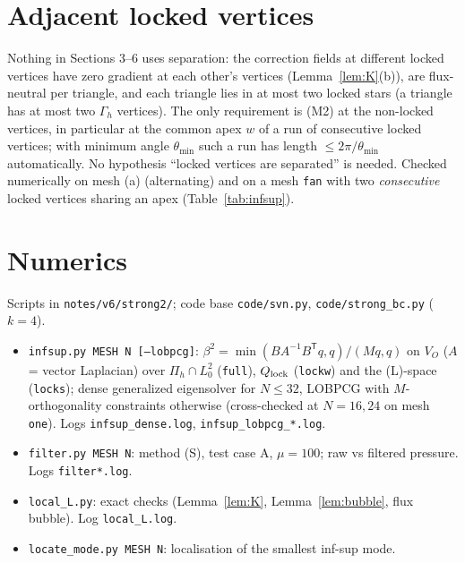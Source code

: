 \documentclass[11pt]{article}
\theoremstyle{remark}
\newcommand{\VO}{V_O}
\newcommand{\Pih}{\Pi_h}
\newcommand{\Ql}{Q_{\rm lock}}
\begin{document}
\section{Adjacent locked vertices}
Nothing in Sections 3--6 uses separation: the correction fields at different locked vertices have zero gradient
at each other's vertices (Lemma~\ref{lem:K}(b)), are flux-neutral per triangle, and each triangle lies in at most
two locked stars (a triangle has at most two $\Gamma_h$ vertices). The only requirement is (M2) at the non-locked
vertices, in particular at the common apex $w$ of a run of consecutive locked vertices; with minimum angle
$\theta_{\min}$ such a run has length $\le 2\pi/\theta_{\min}$ automatically. No hypothesis ``locked vertices are
separated'' is needed. Checked numerically on mesh (a) (alternating) and on a mesh \texttt{fan} with two
\emph{consecutive} locked vertices sharing an apex (Table~\ref{tab:infsup}).

\section{Numerics}
Scripts in \texttt{notes/v6/strong2/}; code base \texttt{code/svn.py}, \texttt{code/strong\_bc.py} ($k=4$).
\begin{itemize}
\item \texttt{infsup.py MESH N [--lobpcg]}: $\beta^2=\min(BA^{-1}B^{\mathsf T}q,q)/(Mq,q)$ on $\VO$ ($A$ = vector
Laplacian) over $\Pih\cap L^2_0$ (\texttt{full}), $\Ql$ (\texttt{lockw}) and the (L)-space (\texttt{locks}); dense
generalized eigensolver for $N\le32$, LOBPCG with $M$-orthogonality constraints otherwise (cross-checked at
$N=16,24$ on mesh \texttt{one}). Logs \texttt{infsup\_dense.log}, \texttt{infsup\_lobpcg\_*.log}.
\item \texttt{filter.py MESH N}: method (S), test case A, $\mu=100$; raw vs filtered pressure. Logs \texttt{filter*.log}.
\item \texttt{local\_L.py}: exact checks (Lemma~\ref{lem:K}, Lemma~\ref{lem:bubble}, flux bubble). Log \texttt{local\_L.log}.
\item \texttt{locate\_mode.py MESH N}: localisation of the smallest inf-sup mode.
\end{itemize}




\end{document}
